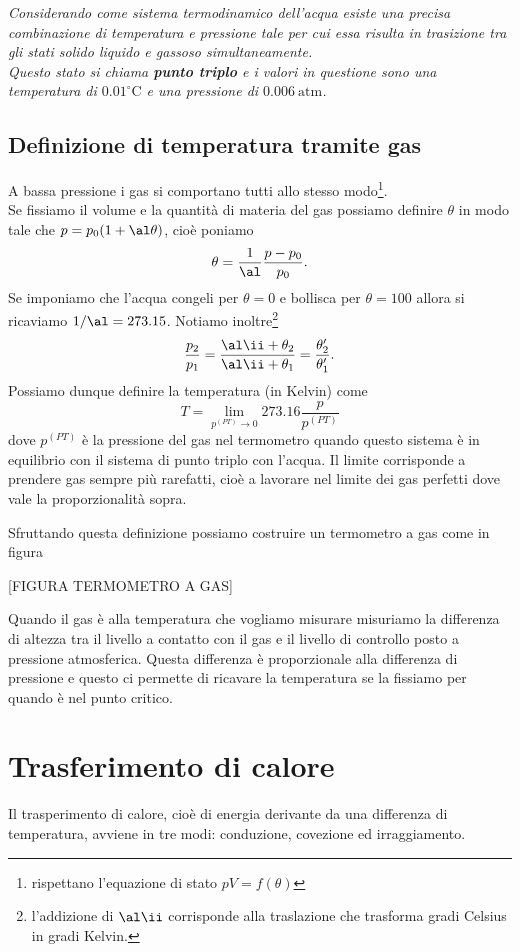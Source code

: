 \documentclass[a4paper]{report}
\begin{document}
\begin{fact}
\emph{Considerando come sistema termodinamico dell'acqua esiste una precisa combinazione di temperatura e pressione tale per cui essa risulta in trasizione tra gli stati solido liquido e gassoso simultaneamente.\\
Questo stato si chiama \textbf{punto triplo} e i valori in questione sono una temperatura di $0.01 ^\circ \mathrm{C}$ e una pressione di $0.006\ \mathrm{atm}$.}
\end{fact}


\subsection{Definizione di temperatura tramite gas}
A bassa pressione i gas si comportano tutti allo stesso modo\footnote{rispettano l'equazione di stato $pV=f(\theta)$}.\\
Se fissiamo il volume e la quantit\`a di materia del gas possiamo definire $\theta$ in modo tale che $p=p_0(1+\al\theta)$, cio\`e poniamo 
\[\theta=\frac1\al\frac{p-p_0}{p_0}.\] 
Se imponiamo che l'acqua congeli per $\theta=0$ e bollisca per $\theta=100$ allora si ricaviamo $1/\al=273.15$. Notiamo inoltre\footnote{l'addizione di $\al\ii$ corrisponde alla traslazione che trasforma gradi Celsius in gradi Kelvin.}
\[\frac{p_2}{p_1}=\frac{\al\ii+\theta_2}{\al\ii +\theta_1}=\frac{\theta_2'}{\theta_1'}.\]
Possiamo dunque definire la temperatura (in Kelvin) come
\[T=\lim_{p^{(PT)}\to 0}273.16 \frac{p}{p^{(PT)}}\]
dove $p^{(PT)}$ \`e la pressione del gas nel termometro quando questo sistema \`e in equilibrio con il sistema di punto triplo con l'acqua. Il limite corrisponde a prendere gas sempre pi\`u rarefatti, cio\`e a lavorare nel limite dei gas perfetti dove vale la proporzionalit\`a sopra.
\medskip

\noindent Sfruttando questa definizione possiamo costruire un termometro a gas come in figura

[FIGURA TERMOMETRO A GAS]

\noindent Quando il gas \`e alla temperatura che vogliamo misurare misuriamo la differenza di altezza tra il livello a contatto con il gas e il livello di controllo posto a pressione atmosferica. Questa differenza \`e proporzionale alla differenza di pressione e questo ci permette di ricavare la temperatura se la fissiamo per quando \`e nel punto critico.


\section{Trasferimento di calore}
Il trasperimento di calore, cio\`e di energia derivante da una differenza di temperatura, avviene in tre modi: conduzione, covezione ed irraggiamento.
\end{document}
